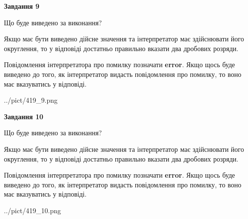 \documentclass[12pt, ukrainian]{article}
\begin{document}
{\begin {Large}
{\begin {center}\textbf{Завдання 9}\end {center}}\par
Що буде виведено за виконання? \par

Якщо має бути виведено дійсне значення та інтерпретатор має здійснювати його округлення, 
то у відповіді достатньо правильно вказати два дробових розряди.

Повідомлення інтерпретатора про помилку позначати \textbf{error}.
Якщо щось буде виведено до того, як інтерпретатор видасть повідомлення про помилку, 
то воно має вказуватись у відповіді. \par

\begin{center}
	{../pict/419_9.png}
\end{center}
\newpage

{\begin {center}\textbf{Завдання 10}\end {center}}\par
Що буде виведено за виконання? \par

Якщо має бути виведено дійсне значення та інтерпретатор має здійснювати його округлення, 
то у відповіді достатньо правильно вказати два дробових розряди.

Повідомлення інтерпретатора про помилку позначати \textbf{error}.
Якщо щось буде виведено до того, як інтерпретатор видасть повідомлення про помилку, 
то воно має вказуватись у відповіді. \par

\begin{center}
	{../pict/419_10.png}
\end{center}
\newpage

\end {Large}}
\end{document}
